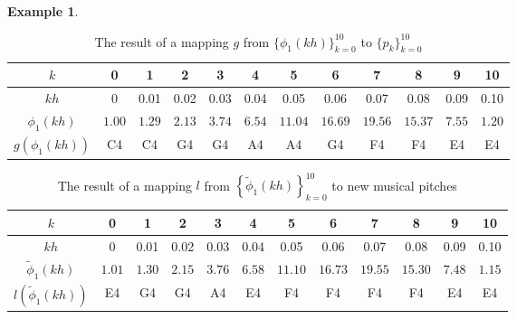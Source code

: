 \documentclass[11pt]{article}
\theoremstyle{definition}
\newtheorem{example}[theorem]{Example}
\begin{document}
\begin{example}
\begin{table}
\caption{The result of a mapping $g$ from $\{ \phi_1(kh) \}_{k=0}^{10}$ to $\{p_k\}_{k=0}^{10}$}
\begin{tabular}{|c||c|c|c|c|c|c|c|c|c|c|c|}
\hline
$k$ & 0 & 1 & 2 & 3 & 4 & 5 & 6 & 7 & 8 & 9 & 10 \\
\hline
$kh$ & 0 & 0.01 & 0.02 & 0.03 & 0.04 & 0.05 & 0.06 & 0.07 & 0.08 & 0.09 & 0.10 \\
\hline
$\phi_1(kh)$ & $1.00$ & $1.29$ & $2.13$ & $3.74$ & $6.54$ & $11.04$ & $16.69$ & $19.56$ & $15.37$ & $7.55$ & $1.20$ \\
\hline
$g(\phi_1(kh))$ & C4 & C4 & G4 & G4 & A4 & A4 & G4 & F4 & F4 & E4 & E4  \\
\hline
\end{tabular}
\label{table: gmap}
\end{table}

\begin{table}
\caption{The result of a mapping $l$ from $\left\{\tilde{\phi}_1(kh) \right\}_{k=0}^{10}$ to new musical pitches}
\begin{tabular}{|c||c|c|c|c|c|c|c|c|c|c|c|}
\hline
$k$ & 0 & 1 & 2 & 3 & 4 & 5 & 6 & 7 & 8 & 9 & 10 \\
\hline
$kh$ & 0 & 0.01 & 0.02 & 0.03 & 0.04 & 0.05 & 0.06 & 0.07 & 0.08 & 0.09 & 0.10 \\
\hline
$\tilde{\phi}_1(kh)$ & $1.01$ & $1.30$ & $2.15$ & $3.76$ & $6.58$ & $11.10$ & $16.73$ & $19.55$ & $15.30$ & $7.48$ & $1.15$ \\
\hline
$l(\tilde{\phi}_1(kh))$ & E4 & G4 & G4 & A4 & E4 & F4 & F4 & F4 & F4 & E4 & E4  \\
\hline
\end{tabular}
\label{table: lmap}
\end{table}

\end{example}
\end{document}
